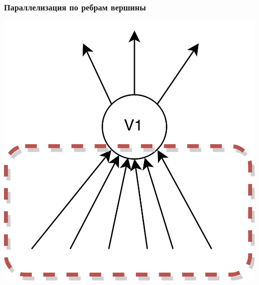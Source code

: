 \documentclass[10pt, compress]{beamer}
\begin{document}
\begin{frame}[fragile]
  \frametitle{Параллелизация по ребрам вершины}
  {\vspace{-2em}\begin{center}\includegraphics[height=0.75\textheight]{images/bf_par_1.png}\end{center}}
\end{frame}
\end{document}
